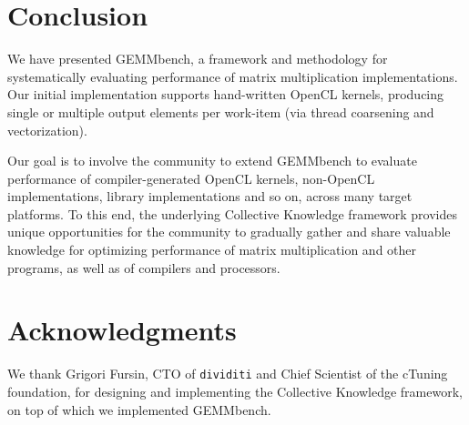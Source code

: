 \documentclass{acm_proc_article-sp} %
\begin{document}
\section{Conclusion}

We have presented GEMMbench, a framework and methodology for systematically
evaluating performance of matrix multiplication implementations.
%
Our initial implementation supports hand-written OpenCL kernels, producing
single or multiple output elements per work-item (via thread coarsening and
vectorization).
%

Our goal is to involve the community to extend GEMMbench to evaluate
performance of compiler-generated OpenCL kernels, non-OpenCL implementations,
library implementations and so on, across many target platforms.
%
To this end, the underlying Collective Knowledge framework provides unique
opportunities for the community to gradually gather and share valuable
knowledge for optimizing performance of matrix multiplication and other
programs, as well as of compilers and processors.
%

\section*{Acknowledgments}

We thank Grigori Fursin, CTO of {\tt dividiti} and Chief Scientist of the
cTuning foundation, for designing and implementing the Collective
Knowledge framework, on top of which we implemented GEMMbench.





\end{document}
